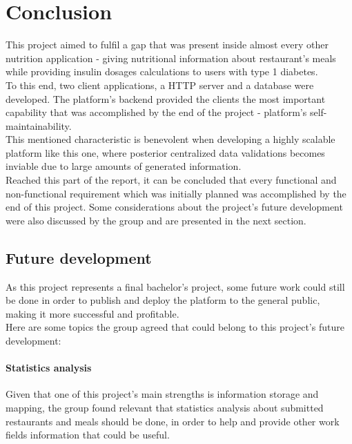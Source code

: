 \chapter{Conclusion}

This project aimed to fulfil a gap that was present inside almost every other nutrition application - 
giving nutritional information about restaurant's meals while providing insulin dosages calculations
to users with type 1 diabetes.\\

To this end, two client applications, a HTTP server and a database were developed.
The platform's backend provided the clients the most important capability that was accomplished by the end
of the project - platform's self-maintainability.\\

This mentioned characteristic is benevolent when developing a highly scalable platform like this one,
where posterior centralized data validations becomes inviable due to large amounts of generated information.\\

Reached this part of the report, it can be concluded that every functional and non-functional requirement which 
was initially planned was accomplished by the end of this project. Some considerations about the project's future
development were also discussed by the group and are presented in the next section.\\

\section{Future development}

As this project represents a final bachelor's project, some future work could still be done in order
to publish and deploy the platform to the general public, making it more successful and profitable.\\

Here are some topics the group agreed that could belong to this project's future development:

\subsubsection{Statistics analysis}

Given that one of this project's main strengths is information storage and mapping, the group found
relevant that statistics analysis about submitted restaurants and meals should be done, 
in order to help and provide other work fields information that could be useful.\\


